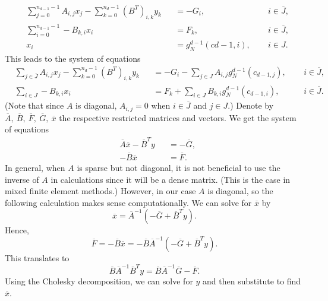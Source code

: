 \begin{discussion}
\begin{subequations}
\begin{alignat}{3}
      & \sum_{j = 0}^{n_{d - 1} - 1} A_{i, j} x_j
        - \sum_{k = 0}^{n_d - 1} (B^T)_{i, k} y_k
      && = - G_i, \enspace
      && i \in \overline{J}, \\
      & \sum_{i = 0}^{n_{d - 1} - 1} - B_{k, i} x_i
      && = F_k, \enspace
      && i \in \overline{J}, \\
      & x_i
      && = g_N^{d - 1}(c{d - 1, i}), \enspace
      && i \in J.
    \end{alignat}
  \end{subequations}
  This leads to the system of equations
  \begin{subequations}
    \begin{alignat}{3}
      & \sum_{j \in \overline{J}} A_{i, j} x_j
        - \sum_{k = 0}^{n_d - 1} (B^T)_{i, k} y_k
      && = - G_i - \sum_{j \in J} A_{i, j} g_N^{d - 1}(c_{d - 1, j}), \enspace
      && i \in \overline{J}, \\
      & \sum_{i \in J} - B_{k, i} x_i
      && = F_k + \sum_{i \in J} B_{k, i} g_N^{d - 1}(c_{d - 1, i}), \enspace
      && i \in \overline{J}.
    \end{alignat}
  \end{subequations}
  (Note that since $A$ is diagonal, $A_{i, j} = 0$ when $i \in \overline{J}$ and
  $j \in J$.)
  Denote by $\overline{A},\ \overline{B},\ \overline{F},\ \overline{G},\
  \overline{x}$ the respective restricted matrices and vectors.
  We get the system of equations
  \begin{subequations}
    \begin{alignat}{2}
      & \overline{A} \overline{x} - \overline{B}^T y
      && = - \overline{G}, \\
      & - \overline{B} \overline{x}
      && = \overline{F}.
    \end{alignat}
  \end{subequations}
  In general, when $A$ is sparse but not diagonal, it is not beneficial to use
  the inverse of $A$ in calculations since it will be a dense matrix.
  (This is the case in mixed finite element methods.)
  However, in our case $A$ is diagonal, so the following calculation makes sense
  computationally.
  We can solve for $\overline{x}$ by
  \begin{equation}
    \overline{x} = \overline{A}^{-1} (- \overline{G} + \overline{B}^T y).
  \end{equation}
  Hence,
  \begin{equation}
    \overline{F}
    = - \overline{B} \overline{x}
    = - \overline{B} \overline{A}^{-1} (- \overline{G} + \overline{B}^T y).
  \end{equation}
  This translates to
  \begin{equation}
    \overline{B} \overline{A}^{-1} \overline{B}^T y
    = \overline{B} \overline{A}^{-1} \overline{G} - \overline{F}.
  \end{equation}
  Using the Cholesky decomposition, we can solve for $y$ and then substitute to
  find $\overline{x}$.
\end{discussion}
